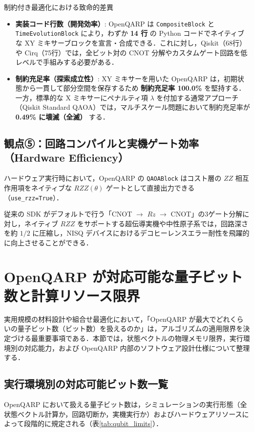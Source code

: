 \documentclass[11pt,a4paper]{ltjsarticle}
\begin{document}
\begin{alertbox}{制約付き最適化における致命的差異}
\begin{itemize}\setlength{\itemsep}{1mm}
    \item \textbf{実装コード行数（開発効率）}:
    OpenQARP は \texttt{CompositeBlock} と \texttt{TimeEvolutionBlock} により，わずか \textbf{14 行} の Python コードでネイティブな XY ミキサーブロックを宣言・合成できる．これに対し，Qiskit（68行）や Cirq（75行）では，全ビット対の CNOT 分解やカスタムゲート回路を低レベルで手組みする必要がある．
    \item \textbf{制約充足率（探索成立性）}:
    XY ミキサーを用いた OpenQARP は，初期状態から一貫して部分空間を保存するため \textbf{制約充足率 100.0\%} を堅持する．一方，標準的な X ミキサーにペナルティ項 $\lambda$ を付加する通常アプローチ（Qiskit Standard QAOA）では，マルチスケール問題において制約充足率が \textbf{0.49\% に壊滅（全滅）} する．
\end{itemize}
\end{alertbox}

\subsection{観点⑤：回路コンパイルと実機ゲート効率（Hardware Efficiency）}
ハードウェア実行時において，OpenQARP の \texttt{QAOABlock} はコスト層の $ZZ$ 相互作用項をネイティブな $RZZ(\theta)$ ゲートとして直接出力できる（\texttt{use\_rzz=True}）．

従来の SDK がデフォルトで行う「CNOT $\to$ $Rz$ $\to$ CNOT」の3ゲート分解に対し，ネイティブ $RZZ$ をサポートする超伝導実機や中性原子系では，回路深さを約 $1/2$ に圧縮し，NISQ デバイスにおけるデコヒーレンスエラー耐性を飛躍的に向上させることができる．

\section{OpenQARP が対応可能な量子ビット数と計算リソース限界}

実用規模の材料設計や組合せ最適化において，「OpenQARP が最大でどれくらいの量子ビット数（ビット数）を扱えるのか」は，アルゴリズムの適用限界を決定づける最重要事項である．本節では，状態ベクトルの物理メモリ限界，実行環境別の対応能力，および OpenQARP 内部のソフトウェア設計仕様について整理する．

\subsection{実行環境別の対応可能ビット数一覧}
OpenQARP において扱える量子ビット数は，シミュレーションの実行形態（全状態ベクトル計算か，回路切断か，実機実行か）およびハードウェアリソースによって段階的に規定される（表\ref{tab:qubit_limits}）．
\end{document}
